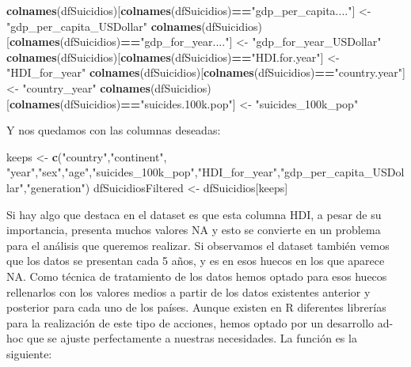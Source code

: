 \documentclass[]{article}
\newenvironment{Shaded}{\begin{snugshade}}{\end{snugshade}}
\newcommand{\KeywordTok}[1]{\textcolor[rgb]{0.13,0.29,0.53}{\textbf{#1}}}
\newcommand{\NormalTok}[1]{#1}
\newcommand{\OperatorTok}[1]{\textcolor[rgb]{0.81,0.36,0.00}{\textbf{#1}}}
\newcommand{\StringTok}[1]{\textcolor[rgb]{0.31,0.60,0.02}{#1}}
\begin{document}
\begin{Shaded}
\begin{Highlighting}[]
\KeywordTok{colnames}\NormalTok{(dfSuicidios)[}\KeywordTok{colnames}\NormalTok{(dfSuicidios)}\OperatorTok{==}\StringTok{"gdp_per_capita...."}\NormalTok{] <-}\StringTok{ "gdp_per_capita_USDollar"}
\KeywordTok{colnames}\NormalTok{(dfSuicidios)[}\KeywordTok{colnames}\NormalTok{(dfSuicidios)}\OperatorTok{==}\StringTok{"gdp_for_year...."}\NormalTok{] <-}\StringTok{ "gdp_for_year_USDollar"}
\KeywordTok{colnames}\NormalTok{(dfSuicidios)[}\KeywordTok{colnames}\NormalTok{(dfSuicidios)}\OperatorTok{==}\StringTok{"HDI.for.year"}\NormalTok{] <-}\StringTok{ "HDI_for_year"}
\KeywordTok{colnames}\NormalTok{(dfSuicidios)[}\KeywordTok{colnames}\NormalTok{(dfSuicidios)}\OperatorTok{==}\StringTok{"country.year"}\NormalTok{] <-}\StringTok{ "country_year"}
\KeywordTok{colnames}\NormalTok{(dfSuicidios)[}\KeywordTok{colnames}\NormalTok{(dfSuicidios)}\OperatorTok{==}\StringTok{"suicides.100k.pop"}\NormalTok{] <-}\StringTok{ "suicides_100k_pop"}
\end{Highlighting}
\end{Shaded}

Y nos quedamos con las columnas deseadas:

\begin{Shaded}
\begin{Highlighting}[]
\NormalTok{keeps <-}\StringTok{ }\KeywordTok{c}\NormalTok{(}\StringTok{"country"}\NormalTok{,}\StringTok{"continent"}\NormalTok{, }\StringTok{"year"}\NormalTok{,}\StringTok{"sex"}\NormalTok{,}\StringTok{"age"}\NormalTok{,}\StringTok{"suicides_100k_pop"}\NormalTok{,}\StringTok{"HDI_for_year"}\NormalTok{,}\StringTok{"gdp_per_capita_USDollar"}\NormalTok{,}\StringTok{"generation"}\NormalTok{)}
\NormalTok{dfSuicidiosFiltered <-}\StringTok{ }\NormalTok{dfSuicidios[keeps]}
\end{Highlighting}
\end{Shaded}

Si hay algo que destaca en el dataset es que esta columna HDI, a pesar
de su importancia, presenta muchos valores NA y esto se convierte en un
problema para el análisis que queremos realizar. Si observamos el
dataset también vemos que los datos se presentan cada 5 años, y es en
esos huecos en los que aparece NA. Como técnica de tratamiento de los
datos hemos optado para esos huecos rellenarlos con los valores medios a
partir de los datos existentes anterior y posterior para cada uno de los
países. Aunque existen en R diferentes librerías para la realización de
este tipo de acciones, hemos optado por un desarrollo ad-hoc que se
ajuste perfectamente a nuestras necesidades. La función es la siguiente:
\end{document}
